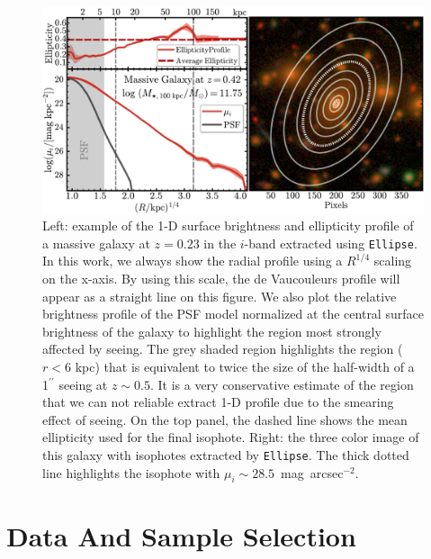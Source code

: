 \documentclass[a4paper,fleqn,usenatbib]{mnras}
\def\asec{$^{\prime\prime}$}
\def\sb{mag~arcsec$^{-2}$}
\begin{document}
    \begin{figure}
        \centering 
        \includegraphics[width=\textwidth]{fig/redbcg_ellipse_example}
        \caption{
            Left: example of the 1-D surface brightness and ellipticity profile 
            of a massive galaxy at $z=0.23$ in the $i$-band extracted using 
            \texttt{Ellipse}. 
            In this work, we always show the radial profile using a $R^{1/4}$ scaling 
            on the x-axis.
            By using this scale, the de Vaucouleurs profile will appear as a straight 
            line on this figure.  
            We also plot the relative brightness profile of the PSF model normalized 
            at the central surface brightness of the galaxy to highlight the region 
            most strongly affected by seeing.
            The grey shaded region highlights the region ($r<6$ kpc) that is equivalent 
            to twice the size of the half-width of a 1\asec{} seeing at $z\sim 0.5$.
            It is a very conservative estimate of the region that we can not reliable 
            extract 1-D profile due to the smearing effect of seeing.
            On the top panel, the dashed line shows the mean ellipticity used for the 
            final isophote. 
            Right: the three color image of this galaxy with isophotes 
            extracted by \texttt{Ellipse}. 
            The thick dotted line highlights the isophote with 
            $\mu_{i}{\sim} 28.5$~\sb.
            }
        \label{fig:ellipse}
    \end{figure}

\section{Data And Sample Selection}
    \label{sec:data}
\end{document}
